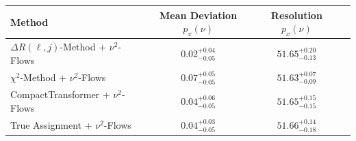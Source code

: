     \begin{tabular}{lccc}
        \toprule
        Method & Mean Deviation $p_{x}(\nu)$ & Resolution $p_{x}(\nu)$ \\
        \midrule
        $\Delta R(\ell,j)$-Method + $\nu^2$-Flows & $0.02^{+0.04}_{-0.05}$ & $51.65^{+0.20}_{-0.13}$ \\
        $\chi^2$-Method + $\nu^2$-Flows & $0.07^{+0.05}_{-0.05}$ & $51.63^{+0.07}_{-0.09}$ \\
        CompactTransformer + $\nu^2$-Flows & $0.04^{+0.06}_{-0.05}$ & $51.65^{+0.15}_{-0.15}$ \\
        True Assignment + $\nu^2$-Flows & $0.04^{+0.03}_{-0.05}$ & $51.66^{+0.14}_{-0.18}$ \\
        \bottomrule
    \end{tabular}